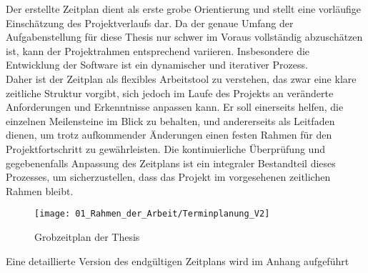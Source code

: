 	Der erstellte Zeitplan dient als erste grobe Orientierung und stellt eine vorläufige Einschätzung des Projektverlaufs dar. Da der genaue Umfang der Aufgabenstellung für diese Thesis nur schwer im Voraus vollständig abzuschätzen ist, kann der Projektrahmen entsprechend variieren. Insbesondere die Entwicklung der Software ist ein dynamischer und iterativer Prozess.
	\\
	Daher ist der Zeitplan als flexibles Arbeitstool zu verstehen, das zwar eine klare zeitliche Struktur vorgibt, sich jedoch im Laufe des Projekts an veränderte Anforderungen und Erkenntnisse anpassen kann. Er soll einerseits helfen, die einzelnen Meilensteine im Blick zu behalten, und andererseits als Leitfaden dienen, um trotz aufkommender Änderungen einen festen Rahmen für den Projektfortschritt zu gewährleisten. Die kontinuierliche Überprüfung und gegebenenfalls Anpassung des Zeitplans ist ein integraler Bestandteil dieses Prozesses, um sicherzustellen, dass das Projekt im vorgesehenen zeitlichen Rahmen bleibt. 

	\begin{figure}[h!]
		\centering
		\texttt{[image: 01\_Rahmen\_der\_Arbeit/Terminplanung\_V2]}
		\caption{Grobzeitplan der Thesis}
		\label{fig:Grobzeitplan}
	\end{figure}
	
	\begin{bfhNoteBox}
		Eine detaillierte Version des endgültigen Zeitplans wird im Anhang aufgeführt 
	\end{bfhNoteBox} 

		